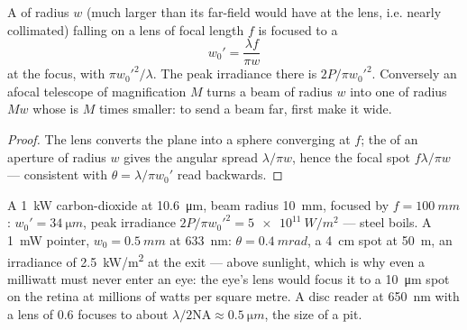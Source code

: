 \begin{proposition}\label{prop:b2:laser:focus}
A  of radius $w$ (much larger than its far-field would
have at the lens, i.e. nearly collimated) falling on a lens of focal
length $f$ is focused to a 
\[
w_0' = \frac{\lambda f}{\pi w}
\]
at the focus, with  $\pi w_0'^2/\lambda$. The peak
irradiance there is $2P/\pi w_0'^2$. Conversely an afocal telescope of
magnification $M$ turns a beam of radius $w$ into one of radius $Mw$
whose  is $M$ times smaller: to send a beam far, first make
it wide.
\end{proposition}

\begin{proof}
The lens converts the plane  into a sphere converging at $f$;
the  of an aperture of radius $w$ gives the angular spread
$\lambda/\pi w$, hence the focal spot $f\lambda/\pi w$ --- consistent with
$\theta = \lambda/\pi w_0'$ read backwards.
\end{proof}

\begin{example}\label{ex:b2:laser:focus}
A \qty{1}{kW} carbon-dioxide  at \qty{10.6}{\micro m}, beam radius
\qty{10}{mm}, focused by $f = \qty{100}{mm}$: $w_0' = \qty{34}{\micro m}$,
peak irradiance $2P/\pi w_0'^2 = \qty{5e11}{W/m^2}$ --- steel boils.
A \qty{1}{mW} pointer, $w_0 = \qty{0.5}{mm}$ at \qty{633}{nm}: $\theta =
\qty{0.4}{mrad}$, a \qty{4}{cm} spot at \qty{50}{m}, an irradiance of
\qty{2.5}{kW/m^2} at the exit --- above sunlight, which is why even a
milliwatt must never enter an eye: the eye's lens would focus it to a
\qty{10}{\micro m} spot on the retina at millions of watts per square
metre. A disc reader at \qty{650}{nm} with a lens of 
$0.6$ focuses to about $\lambda/2\mathrm{NA} \approx \qty{0.5}{\micro m}$,
the size of a pit.
\end{example}


